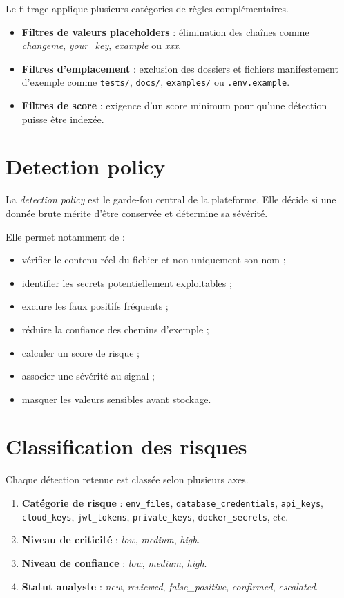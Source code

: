 \documentclass[12pt,a4paper]{report}
\begin{document}
Le filtrage applique plusieurs catégories de règles complémentaires.

\begin{itemize}
  \item \textbf{Filtres de valeurs placeholders} : élimination des chaînes comme \textit{changeme}, \textit{your\_key}, \textit{example} ou \textit{xxx}.
  \item \textbf{Filtres d'emplacement} : exclusion des dossiers et fichiers manifestement d'exemple comme \texttt{tests/}, \texttt{docs/}, \texttt{examples/} ou \texttt{.env.example}.
  \item \textbf{Filtres de score} : exigence d'un score minimum pour qu'une détection puisse être indexée.
\end{itemize}

\section{Detection policy}

La \textit{detection policy} est le garde-fou central de la plateforme. Elle décide si une donnée brute mérite d'être conservée et détermine sa sévérité.

Elle permet notamment de :

\begin{itemize}
  \item vérifier le contenu réel du fichier et non uniquement son nom ;
  \item identifier les secrets potentiellement exploitables ;
  \item exclure les faux positifs fréquents ;
  \item réduire la confiance des chemins d'exemple ;
  \item calculer un score de risque ;
  \item associer une sévérité au signal ;
  \item masquer les valeurs sensibles avant stockage.
\end{itemize}


\section{Classification des risques}

Chaque détection retenue est classée selon plusieurs axes.

\begin{enumerate}
  \item \textbf{Catégorie de risque} : \texttt{env\_files}, \texttt{database\_credentials}, \texttt{api\_keys}, \texttt{cloud\_keys}, \texttt{jwt\_tokens}, \texttt{private\_keys}, \texttt{docker\_secrets}, etc.
  \item \textbf{Niveau de criticité} : \textit{low}, \textit{medium}, \textit{high}.
  \item \textbf{Niveau de confiance} : \textit{low}, \textit{medium}, \textit{high}.
  \item \textbf{Statut analyste} : \textit{new}, \textit{reviewed}, \textit{false\_positive}, \textit{confirmed}, \textit{escalated}.
\end{enumerate}
\end{document}
